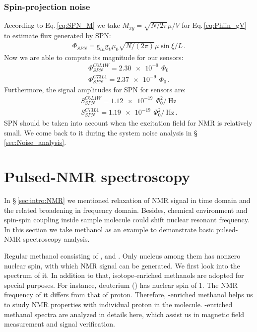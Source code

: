 \subsubsection{Spin-projection noise}\label{sec:SR:FluxinSQUID:SPN}

According to  Eq.\,\eqref{eq:SPN_M} we take $M_{xy} =\sqrt{N/2\pi} \mu/V $ for Eq.\,\eqref{eq:Phiin_gV} to estimate flux generated by SPN:
\begin{align}
	\Phi_{SPN} = \mathrm{g}_{in} \mathrm{g}_V \mu_0 \sqrt{N/(2\pi)} \mu \sin\xi / L\,. \label{eq:Phiin_gV_SPN}
\end{align}
Now we are able to compute its magnitude for our sensors:
\begin{align}
	\Phi^{C6L1W}_{SPN} =\SI{2.30e-9}{}\,\Phi_0\\
	\Phi^{C73L1}_{SPN} =\SI{2.37e-9}{}\,\Phi_0\,. 
\end{align}
Furthermore, the signal amplitudes for SPN for sensors are:
\begin{align}
	S^{C6L1W}_{SPN} =\SI{1.12e-19}{}\,\Phi_0^{2}/\SI{}{\Hz}\\
	S^{C73L1}_{SPN} =\SI{1.19e-19}{}\,\Phi_0^{2}/\SI{}{\Hz}\,. 
\end{align}
SPN should be taken into account when the excitation field for NMR is relatively small. We come back to it during the system noise analysis in \S\,\ref{sec:Noise_analysis}. 

\section{Pulsed-NMR spectroscopy}

In \S\,\ref{sec:intro:NMR} we mentioned relaxation of NMR signal in time domain and the related broadening in frequency domain. Besides, chemical environment and spin-spin coupling inside sample molecule could shift nuclear resonant frequency. In this section we take methanol as an example to demonstrate basic pulsed-NMR spectroscopy analysis. 

Regular methanol consisting of ,  and . Only  nucleus among them has nonzero nuclear spin, with which NMR signal can be generated. We first look into the spectrum of it. In addition to that, isotope-enriched methanols are adopted for special purposes. For instance, deuterium () has nuclear spin of 1. The NMR frequency of it differs from that of proton. Therefore, -enriched methanol helps us to study NMR properties with individual proton in the molecule. -enriched methanol spectra are analyzed in details here, which assist us in magnetic field measurement and signal verification. 

